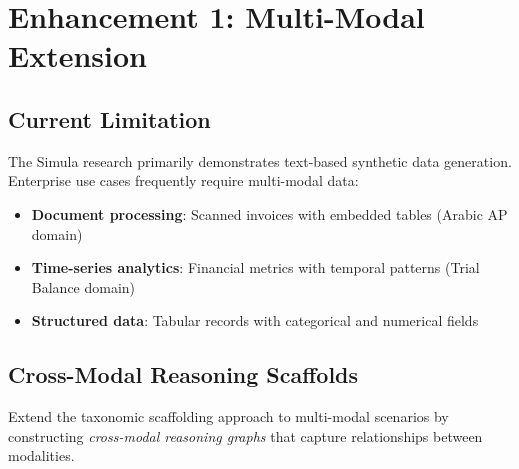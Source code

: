 \section{Enhancement 1: Multi-Modal Extension}

\subsection{Current Limitation}

The Simula research primarily demonstrates text-based synthetic data generation.
Enterprise use cases frequently require multi-modal data:
\begin{itemize}
  \item \textbf{Document processing}: Scanned invoices with embedded tables (Arabic AP domain)
  \item \textbf{Time-series analytics}: Financial metrics with temporal patterns (Trial Balance domain)
  \item \textbf{Structured data}: Tabular records with categorical and numerical fields
\end{itemize}

\subsection{Cross-Modal Reasoning Scaffolds}

Extend the taxonomic scaffolding approach to multi-modal scenarios by constructing
\emph{cross-modal reasoning graphs} that capture relationships between modalities.

